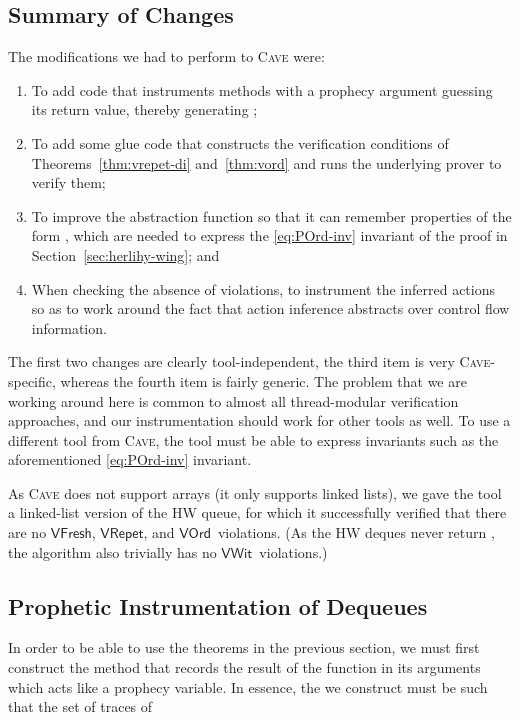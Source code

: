\documentclass{LMCS}
\newcommand{\VFresh}{\ensuremath{\mathsf{VFresh}}}
\newcommand{\VRepet}{\ensuremath{\mathsf{VRepet}}}
\newcommand{\VOrd}{\ensuremath{\mathsf{VOrd}}}
\newcommand{\VWit}{\ensuremath{\mathsf{VWit}}}
\begin{document}
\subsection*{Summary of Changes}

The modifications we had to perform to \textsc{Cave} were:
\begin{enumerate}
\item To add code that instruments  methods with a prophecy argument
guessing its return value, thereby generating ;
\item To add some glue code that constructs the verification conditions of
Theorems~\ref{thm:vrepet-di} and~\ref{thm:vord} and runs the 
underlying prover to verify them;
\item To improve the abstraction function so that it can remember properties of the
form , which are needed to express the \eqref{eq:POrd-inv} invariant
of the proof in Section~\ref{sec:herlihy-wing}; and
\item When checking the absence of  violations, 
to instrument the inferred actions so as to work around the fact 
that action inference abstracts over control flow information.
\end{enumerate}
The first two changes are clearly tool-independent, the third item is 
very \textsc{Cave}-specific, whereas the fourth item is fairly generic. 
The problem that we are working around here is common to almost
all thread-modular verification approaches, and our instrumentation 
should work for other tools as well.  
To use a different tool from \textsc{Cave}, the tool must be able to express 
invariants such as the aforementioned \eqref{eq:POrd-inv} invariant.

As \textsc{Cave} does not support arrays (it only supports linked lists), we
gave the tool a linked-list version of the HW queue, for which it successfully 
verified that there are no \VFresh, \VRepet, and \VOrd\ violations.
(As the HW deques never return , the algorithm also trivially has no
\VWit\ violations.) 


\subsection*{Prophetic Instrumentation of Dequeues}

In order to be able to use the theorems in the previous section, we must first
construct the method  that records the result of the  function
in its arguments which acts like a prophecy variable.
In essence, the  we construct must be such that the set of traces of
 
\end{document}
